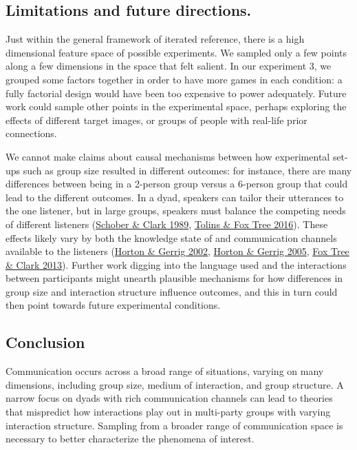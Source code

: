 \documentclass[
  english,
  a4paper,
]{article}
\begin{document}
\hypertarget{limitations-and-future-directions.}{%
\subsection{Limitations and future directions.}\label{limitations-and-future-directions.}}

Just within the general framework of iterated reference, there is a high dimensional feature space of possible experiments. We sampled only a few points along a few dimensions in the space that felt salient. In our experiment 3, we grouped some factors together in order to have more games in each condition: a fully factorial design would have been too expensive to power adequately. Future work could sample other points in the experimental space, perhaps exploring the effects of different target images, or groups of people with real-life prior connections.

We cannot make claims about causal mechanisms between how experimental set-ups such as group size resulted in different outcomes: for instance, there are many differences between being in a 2-person group versus a 6-person group that could lead to the different outcomes. In a dyad, speakers can tailor their utterances to the one listener, but in large groups, speakers must balance the competing needs of different listeners (\protect\hyperlink{ref-schober1989}{Schober \& Clark 1989}, \protect\hyperlink{ref-tolins2016}{Tolins \& Fox Tree 2016}). These effects likely vary by both the knowledge state of and communication channels available to the listeners (\protect\hyperlink{ref-horton2002}{Horton \& Gerrig 2002}, \protect\hyperlink{ref-horton2005}{Horton \& Gerrig 2005}, \protect\hyperlink{ref-fox-tree2013}{Fox Tree \& Clark 2013}). Further work digging into the language used and the interactions between participants might unearth plausible mechanisms for how differences in group size and interaction structure influence outcomes, and this in turn could then point towards future experimental conditions.

\hypertarget{conclusion}{%
\subsection{Conclusion}\label{conclusion}}

Communication occurs across a broad range of situations, varying on many dimensions, including group size, medium of interaction, and group structure. A narrow focus on dyads with rich communication channels can lead to theories that mispredict how interactions play out in multi-party groups with varying interaction structure. Sampling from a broader range of communication space is necessary to better characterize the phenomena of interest.
\end{document}
